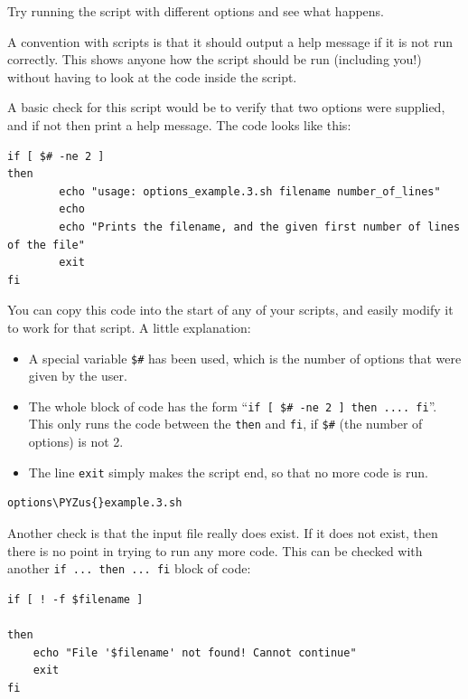 \documentclass[11pt]{article}
\makeatletter
\providecommand{\tightlist}{%
      \setlength{\itemsep}{0pt}\setlength{\parskip}{0pt}}
\def\PYZus{\char`\_}
\newcommand{\boxspacing}{\kern\kvtcb@left@rule\kern\kvtcb@boxsep}
\newcommand{\prompt}[4]{
        {\ttfamily\llap{{\color{blue}\LARGE\faKeyboardO\hspace{3pt}#4}}\vspace{-\baselineskip}}
    }
\makeatother
\begin{document}
Try running the script with different options and see what happens.

A convention with scripts is that it should output a help message if it
is not run correctly. This shows anyone how the script should be run
(including you!) without having to look at the code inside the script.

A basic check for this script would be to verify that two options were
supplied, and if not then print a help message. The code looks like
this:

\begin{verbatim}
if [ $# -ne 2 ]
then
        echo "usage: options_example.3.sh filename number_of_lines"
        echo
        echo "Prints the filename, and the given first number of lines of the file"
        exit
fi
\end{verbatim}

You can copy this code into the start of any of your scripts, and easily
modify it to work for that script. A little explanation:

\begin{itemize}
\tightlist
\item
  A special variable \texttt{\$\#} has been used, which is the number of
  options that were given by the user.
\item
  The whole block of code has the form
  ``\texttt{if\ {[}\ \$\#\ -ne\ 2\ {]}\ then\ ....\ fi}''. This only
  runs the code between the \texttt{then} and \texttt{fi}, if
  \texttt{\$\#} (the number of options) is not 2.
\item
  The line \texttt{exit} simply makes the script end, so that no more
  code is run.
\end{itemize}

    \begin{tcolorbox}[breakable, size=fbox, boxrule=1pt, pad at break*=1mm,colback=cellbackground, colframe=cellborder]
\prompt{In}{incolor}{ }{\boxspacing}
\begin{Verbatim}[commandchars=\\\{\}]
options\PYZus{}example.3.sh
\end{Verbatim}
\end{tcolorbox}

    Another check is that the input file really does exist. If it does not
exist, then there is no point in trying to run any more code. This can
be checked with another \texttt{if\ ...\ then\ ...\ fi} block of code:

\begin{verbatim}
if [ ! -f $filename ]

then
    echo "File '$filename' not found! Cannot continue"
    exit
fi
\end{verbatim}
\end{document}
